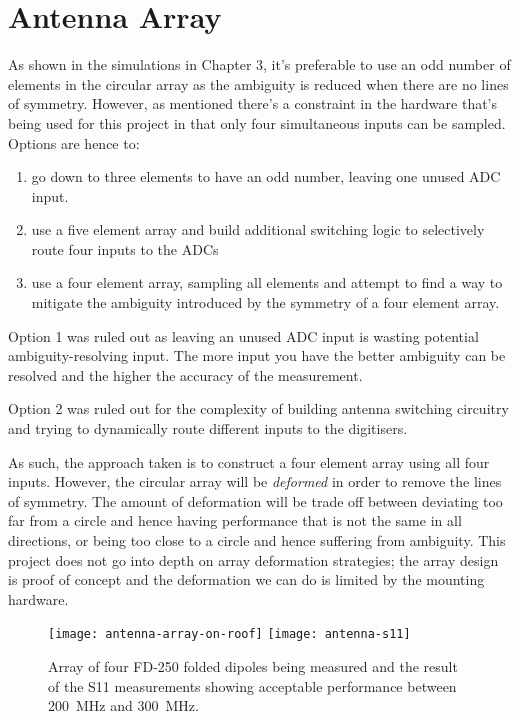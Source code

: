 \section{Antenna Array}

As shown in the simulations in Chapter 3, it's preferable to use an odd number of elements in the circular array as the ambiguity is reduced when there are no lines of symmetry. However, as mentioned there's a constraint in the hardware that's being used for this project in that only four simultaneous inputs can be sampled. Options are hence to:
\begin{enumerate}
  \item go down to three elements to have an odd number, leaving one unused ADC input.
  \item use a five element array and build additional switching logic to selectively route four inputs to the ADCs
  \item use a four element array, sampling all elements and attempt to find a way to mitigate the ambiguity introduced by the symmetry of a four element array.
\end{enumerate}
    
Option 1 was ruled out as leaving an unused ADC input is wasting potential ambiguity-resolving input. The more input you have the better ambiguity can be resolved and the higher the accuracy of the measurement. 

Option 2 was ruled out for the complexity of building antenna switching circuitry and trying to dynamically route different inputs to the digitisers. 

As such, the approach taken is to construct a four element array using all four inputs. However, the circular array will be \emph{deformed} in order to remove the lines of symmetry. The amount of deformation will be trade off between deviating too far from a circle and hence having performance that is not the same in all directions, or being too close to a circle and hence suffering from ambiguity. This project does not go into depth on array deformation strategies; the array design is proof of concept and the deformation we can do is limited by the mounting hardware.\\

\begin{figure}
  \centering
  \texttt{[image: antenna-array-on-roof]}
  \texttt{[image: antenna-s11]}
  \caption{Array of four FD-250 folded dipoles being measured and the result of the S11 measurements showing acceptable performance between \SI{200}{\mega\hertz} and \SI{300}{\mega\hertz}.}
  \label{fig:rf-front-end:antenna-array-s11}
\end{figure}

